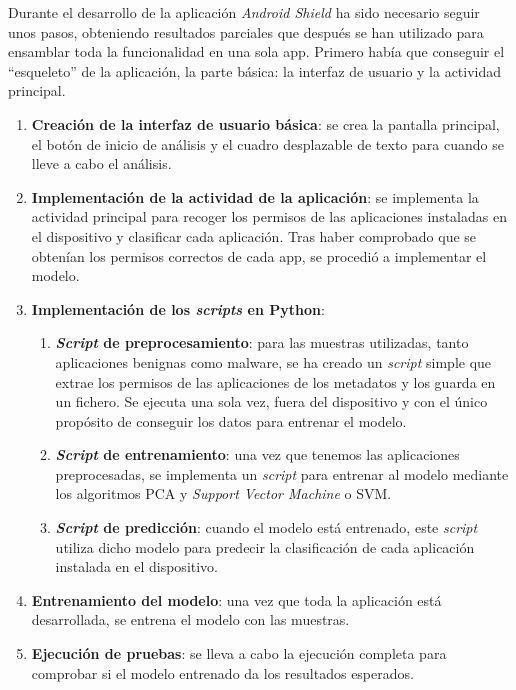 Durante el desarrollo de la aplicación \textit{Android Shield} ha sido necesario seguir unos pasos, obteniendo resultados parciales que después se han utilizado para ensamblar toda la funcionalidad en una sola app. Primero había que conseguir el ``esqueleto'' de la aplicación, la parte básica: la interfaz de usuario y la actividad principal.

\begin{enumerate}
	\item \textbf{Creación de la interfaz de usuario básica}: se crea la pantalla principal, el botón de inicio de análisis y el cuadro desplazable de texto para cuando se lleve a cabo el análisis.
	\item \textbf{Implementación de la actividad de la aplicación}: se implementa la actividad principal para recoger los permisos de las aplicaciones instaladas en el dispositivo y clasificar cada aplicación. Tras haber comprobado que se obtenían los permisos correctos de cada app, se procedió a implementar el modelo.
	\item \textbf{Implementación de los \textit{scripts} en Python}:
		\begin{enumerate}
			\item \textbf{\textit{Script} de preprocesamiento}: para las muestras utilizadas, tanto aplicaciones benignas como malware, se ha creado un \textit{script} simple que extrae los permisos de las aplicaciones de los metadatos y los guarda en un fichero. Se ejecuta una sola vez, fuera del dispositivo y con el único propósito de conseguir los datos para entrenar el modelo.
			\item \textbf{\textit{Script} de entrenamiento}: una vez que tenemos las aplicaciones preprocesadas, se implementa un \textit{script} para entrenar al modelo mediante los algoritmos PCA y \textit{Support Vector Machine} o SVM.
			\item \textbf{\textit{Script} de predicción}: cuando el modelo está entrenado, este \textit{script} utiliza dicho modelo para predecir la clasificación de cada aplicación instalada en el dispositivo. 
		\end{enumerate}
	\item \textbf{Entrenamiento del modelo}: una vez que toda la aplicación está desarrollada, se entrena el modelo con las muestras.
	\item \textbf{Ejecución de pruebas}: se lleva a cabo la ejecución completa para comprobar si el modelo entrenado da los resultados esperados.
\end{enumerate}

